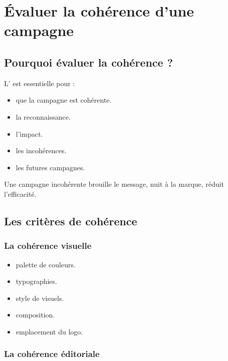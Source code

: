 \section{Évaluer la cohérence d'une campagne}

\subsection{Pourquoi évaluer la cohérence ?}

L' est essentielle pour :

\begin{itemize}
    \item {} que la campagne est cohérente.
    \item {} la reconnaissance.
    \item {} l'impact.
    \item {} les incohérences.
    \item {} les futures campagnes.
\end{itemize}

Une campagne incohérente brouille le message, nuit à la marque, réduit l'efficacité.

\subsection{Les critères de cohérence}

\subsubsection{La cohérence visuelle}

\begin{itemize}
    \item {} palette de couleurs.
    \item {} typographies.
    \item {} style de visuels.
    \item {} composition.
    \item {} emplacement du logo.
\end{itemize}

\subsubsection{La cohérence éditoriale}

